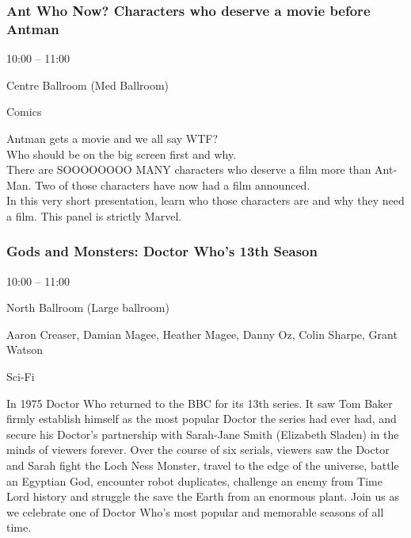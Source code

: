 \documentclass{scrreprt}
\begin{document}
\begin{multicols}{2}
\subsubsection*{Ant Who Now? Characters who deserve a movie before Antman}\begin{description}
\setlength{\itemsep}{0pt}
\setlength{\parsep}{0pt}
\setlength{\parskip}{0pt}
\item[Time:]{10:00 -- 11:00}
\item[Venue:]{Centre Ballroom (Med Ballroom)}
\item[Tags:]{Comics}\end{description}
Antman gets a movie and we all say WTF?\\Who should be on the big screen first and why.\\There are SOOOOOOOO MANY characters who deserve a film more than Ant-Man. Two of those characters have now had a film announced. \\In this very short presentation, learn who those characters are and why they need a film. This panel is strictly Marvel.
\subsubsection*{Gods and Monsters: Doctor Who's 13th Season}\begin{description}
\setlength{\itemsep}{0pt}
\setlength{\parsep}{0pt}
\setlength{\parskip}{0pt}
\item[Time:]{10:00 -- 11:00}
\item[Venue:]{North Ballroom (Large ballroom)}
\item[People:]{Aaron Creaser, Damian Magee, Heather Magee, Danny Oz, Colin Sharpe, Grant Watson}
\item[Tags:]{Sci-Fi}\end{description}
In 1975 Doctor Who returned to the BBC for its 13th series. It saw Tom Baker firmly establish himself as the most popular Doctor the series had ever had, and secure his Doctor's partnership with Sarah-Jane Smith (Elizabeth Sladen) in the minds of viewers forever. Over the course of six serials, viewers saw the Doctor and Sarah fight the Loch Ness Monster, travel to the edge of the universe, battle an Egyptian God, encounter robot duplicates, challenge an enemy from Time Lord history and struggle the save the Earth from an enormous plant. Join us as we celebrate one of Doctor Who's most popular and memorable seasons of all time.

\end{multicols}
\end{document}
